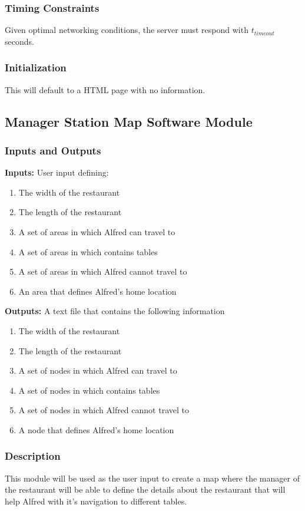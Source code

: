 \documentclass [10pt]{article}
\begin{document}
\subsubsection{Timing Constraints}
Given optimal networking conditions, the server must respond with $ t_{timeout} $ seconds.

\subsubsection{Initialization}
This will default to a HTML page with no information.


\subsection{Manager Station Map Software Module}

\subsubsection{Inputs and Outputs}

\textbf{Inputs: } User input defining:
\begin{enumerate}
	\item The width of the restaurant
	\item The length of the restaurant
	\item A set of areas in which Alfred can travel to
	\item A set of areas in which contains tables
	\item A set of areas in which Alfred cannot travel to
	\item An area that defines Alfred's home location
\end{enumerate}

\textbf{Outputs: } A text file that contains the following information
\begin{enumerate}
	\item The width of the restaurant
	\item The length of the restaurant
	\item A set of nodes in which Alfred can travel to
	\item A set of nodes in which contains tables
	\item A set of nodes in which Alfred cannot travel to
	\item A node that defines Alfred's home location
\end{enumerate}
\subsubsection{Description}
This module will be used as the user input to create a map where the manager of the restaurant will be able to define the details about the restaurant that will help Alfred with it's navigation to different tables.
\end{document}
